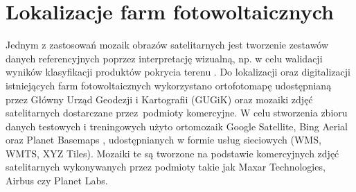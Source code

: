 \documentclass{amuthesis}
\begin{document}
\hypertarget{sec-pv}{%
\section{Lokalizacje farm fotowoltaicznych}\label{sec-pv}}

Jednym z zastosowań mozaik obrazów satelitarnych jest tworzenie zestawów
danych referencyjnych poprzez interpretację wizualną, np. w celu
walidacji wyników klasyfikacji produktów pokrycia terenu
\autocite{lesiv_2018_sat_imagery_mosaics}. Do lokalizacji oraz
digitalizacji istniejących farm fotowoltaicznych wykorzystano
ortofotomapę udostępnianą przez Główny Urząd Geodezji i Kartografii
(GUGiK) oraz mozaiki zdjęć satelitarnych dostarczane przez~podmioty
komercyjne. W celu stworzenia zbioru danych testowych i treningowych
użyto ortomozaik Google Satellite, Bing Aerial oraz Planet Basemaps
\autocite{planet}, udostępnianych w formie usług sieciowych (WMS, WMTS,
XYZ Tiles). Mozaiki te są tworzone na podstawie komercyjnych zdjęć
satelitarnych wykonywanych przez podmioty takie jak Maxar Technologies,
Airbus czy Planet Labs.
\end{document}
